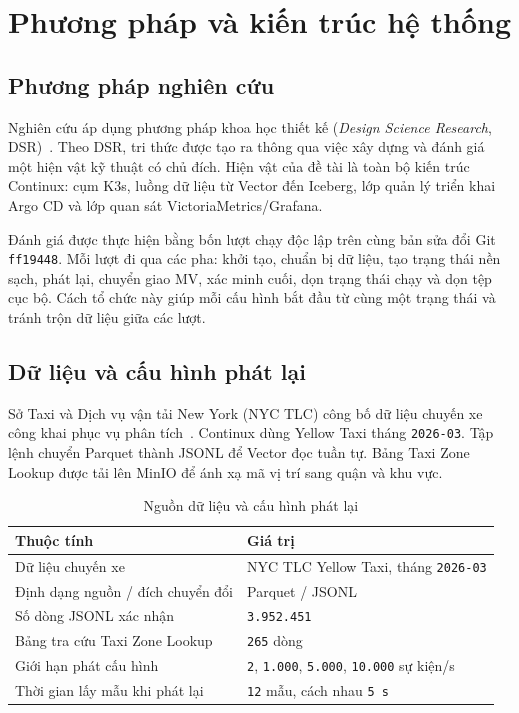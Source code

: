 \section{Phương pháp và kiến trúc hệ thống}\label{sec:method}

\subsection{Phương pháp nghiên cứu}
Nghiên cứu áp dụng phương pháp khoa học thiết kế (\emph{Design Science Research}, DSR)~\parencite{hevner2004design}. Theo DSR, tri thức được tạo ra thông qua việc xây dựng và đánh giá một hiện vật kỹ thuật có chủ đích. Hiện vật của đề tài là toàn bộ kiến trúc Continux: cụm K3s, luồng dữ liệu từ Vector đến Iceberg, lớp quản lý triển khai Argo CD và lớp quan sát VictoriaMetrics/Grafana.

Đánh giá được thực hiện bằng bốn lượt chạy độc lập trên cùng bản sửa đổi Git \texttt{ff19448}. Mỗi lượt đi qua các pha: khởi tạo, chuẩn bị dữ liệu, tạo trạng thái nền sạch, phát lại, chuyển giao MV, xác minh cuối, dọn trạng thái chạy và dọn tệp cục bộ. Cách tổ chức này giúp mỗi cấu hình bắt đầu từ cùng một trạng thái và tránh trộn dữ liệu giữa các lượt.

\subsection{Dữ liệu và cấu hình phát lại}
Sở Taxi và Dịch vụ vận tải New York (NYC TLC) công bố dữ liệu chuyến xe công khai phục vụ phân tích~\parencite{nyctlc}. Continux dùng Yellow Taxi tháng \texttt{2026-03}. Tập lệnh  chuyển Parquet thành JSONL để Vector đọc tuần tự. Bảng Taxi Zone Lookup được tải lên MinIO để ánh xạ mã vị trí sang quận và khu vực.

\begin{table}[t!]
\centering
\caption{Nguồn dữ liệu và cấu hình phát lại}
\label{tab:dataset-profiles-vi}
\begin{tabularx}{\textwidth}{@{}p{}Y@{}}
\toprule
\textbf{Thuộc tính} & \textbf{Giá trị}\\
\midrule
Dữ liệu chuyến xe & NYC TLC Yellow Taxi, tháng \texttt{2026-03}\\
Định dạng nguồn / đích chuyển đổi & Parquet / JSONL\\
Số dòng JSONL xác nhận & \texttt{3.952.451}\\
Bảng tra cứu Taxi Zone Lookup & \texttt{265} dòng\\
Giới hạn phát cấu hình & \texttt{2}, \texttt{1.000}, \texttt{5.000}, \texttt{10.000} sự kiện/s\\
Thời gian lấy mẫu khi phát lại & \texttt{12} mẫu, cách nhau \texttt{5 s}\\
\bottomrule
\end{tabularx}
\end{table}

